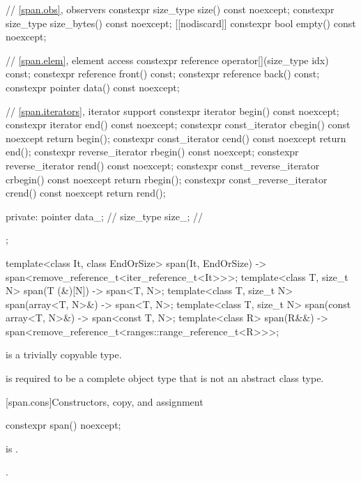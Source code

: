 \begin{codeblock}
{{    // \ref{span.obs}, observers
    constexpr size_type size() const noexcept;
    constexpr size_type size_bytes() const noexcept;
    [[nodiscard]] constexpr bool empty() const noexcept;

    // \ref{span.elem}, element access
    constexpr reference operator[](size_type idx) const;
    constexpr reference front() const;
    constexpr reference back() const;
    constexpr pointer data() const noexcept;

    // \ref{span.iterators}, iterator support
    constexpr iterator begin() const noexcept;
    constexpr iterator end() const noexcept;
    constexpr const_iterator cbegin() const noexcept { return begin(); }
    constexpr const_iterator cend() const noexcept { return end(); }
    constexpr reverse_iterator rbegin() const noexcept;
    constexpr reverse_iterator rend() const noexcept;
    constexpr const_reverse_iterator crbegin() const noexcept { return rbegin(); }
    constexpr const_reverse_iterator crend() const noexcept { return rend(); }

  private:
    pointer data_;              // \expos
    size_type size_;            // \expos
  };

  template<class It, class EndOrSize>
    span(It, EndOrSize) -> span<remove_reference_t<iter_reference_t<It>>>;
  template<class T, size_t N>
    span(T (&)[N]) -> span<T, N>;
  template<class T, size_t N>
    span(array<T, N>&) -> span<T, N>;
  template<class T, size_t N>
    span(const array<T, N>&) -> span<const T, N>;
  template<class R>
    span(R&&) -> span<remove_reference_t<ranges::range_reference_t<R>>>;
}
\end{codeblock}

\pnum
{} is
a trivially copyable type.

\pnum
{} is required to be
a complete object type that is not an abstract class type.

[span.cons]{Constructors, copy, and assignment}

%
\begin{itemdecl}
constexpr span() noexcept;
\end{itemdecl}

\begin{itemdescr}
\pnum
\constraints
{} is .

\pnum
\ensures
{}.
\end{itemdescr}

